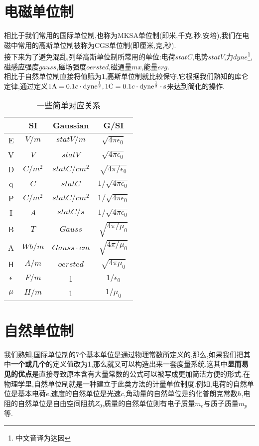 \documentclass[lang=cn,newtx,10pt,scheme=chinese,thmcnt=section]{elegantbook}
\begin{document}
\section{电磁单位制}
相比于我们常用的国际单位制,也称为MKSA单位制(即米,千克,秒,安培),我们在电磁中常用的高斯单位制被称为CGS单位制(即厘米,克,秒).\\接下来为了避免混乱,列举高斯单位制所常用的单位:电荷$statC$,电势$statV$,力$dyne$\footnote{中文音译为达因},磁感应强度$gauss$,磁场强度$oersted$,磁通量$mx$,能量$erg$.\\

相比于自然单位制直接将值赋为1,高斯单位制就比较保守,它根据我们熟知的库仑定律,通过定义$1\mathrm{A}=0.1c\cdot\mathrm{dyne}^{\frac12},1\mathrm{C}=0.1c\cdot\rm{dyne}^{\frac12}\cdot s$来达到简化的操作.\\
\begin{table}[htbp]
	\centering
	\caption{一些简单对应关系}
	\begin{tabular}{|c|c|c|c|}
		\hline
		& SI      & Gaussian        & G/SI                     \\ \hline
		E          & $V/m$   & $statV/m$       & $\sqrt{4\pi\epsilon_0}$  \\ \hline
		V          & $V$     & $statV$         & $\sqrt{4\pi\epsilon_0}$  \\ \hline
		D          & $C/m^2$ & $statC/cm^2$    & $\sqrt{4\pi/\epsilon_0}$ \\ \hline
		q          & $C$     & $statC$         & $1/\sqrt{4\pi\epsilon_0}$ \\ \hline
		P          & $C/m^2$ & $statC/cm^2$    & $1/\sqrt{4\pi\epsilon_0}$ \\ \hline
		I          & $A$     & $statC/s$       & $1/\sqrt{4\pi\epsilon_0}$ \\ \hline
		B          & $T$     & $Gauss$         & $\sqrt{4\pi/\mu_0}$      \\ \hline
		A          & $Wb/m$  & $Gauss\cdot cm$ & $\sqrt{4\pi/\mu_0}$      \\ \hline
		H          & $A/m$   & $oersted$       & $\sqrt{4\pi\mu_0}$       \\ \hline
		$\epsilon$ & $F/m$   & 1               & $1/\epsilon_0$           \\ \hline
		$\mu$      & $H/m$   & 1               & $1/\mu_0$                \\ \hline
	\end{tabular}
\end{table}
\section{自然单位制}
我们熟知,国际单位制的7个基本单位是通过物理常数所定义的,那么,如果我们把其中\textbf{一个或几个}的定义值改为1,那么就又可以构造出来一套度量系统.这其中\textbf{显而易见的优点}是直接导致原本含有大量常数的公式可以被写成更加简洁方便的形式.在物理学里,自然单位制就是一种建立于此类方法的计量单位制度.例如,电荷的自然单位是基本电荷${\displaystyle e}$,速度的自然单位是光速${\displaystyle c}$,角动量的自然单位是约化普朗克常数${\displaystyle \hbar }$,电阻的自然单位是自由空间阻抗${\displaystyle Z_{0}}$,质量的自然单位则有电子质量${\displaystyle m_{e}}$与质子质量${\displaystyle m_{p}}$等.\\
\end{document}
